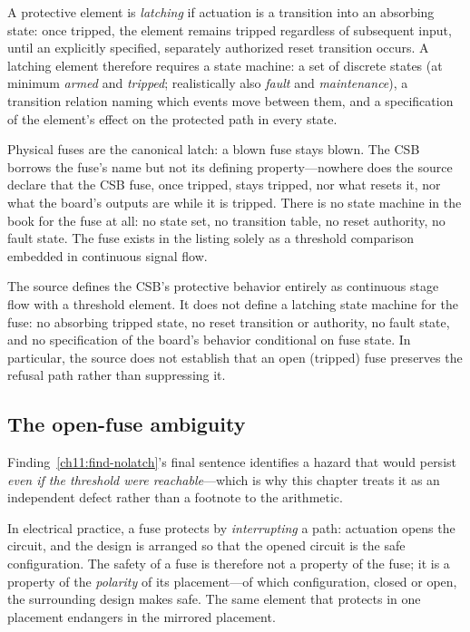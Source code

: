 \begin{definition}\label{ch11:def-latch}
A protective element is \emph{latching} if actuation is a transition into an absorbing state: once tripped, the element remains tripped regardless of subsequent input, until an explicitly specified, separately authorized reset transition occurs. A latching element therefore requires a state machine: a set of discrete states (at minimum \emph{armed} and \emph{tripped}; realistically also \emph{fault} and \emph{maintenance}), a transition relation naming which events move between them, and a specification of the element's effect on the protected path in every state.
\end{definition}

Physical fuses are the canonical latch: a blown fuse stays blown. The CSB borrows the fuse's name but not its defining property---nowhere does the source declare that the CSB fuse, once tripped, stays tripped, nor what resets it, nor what the board's outputs are while it is tripped. There is no state machine in the book for the fuse at all: no state set, no transition table, no reset authority, no fault state. The fuse exists in the listing solely as a threshold comparison embedded in continuous signal flow.

\begin{finding}\label{ch11:find-nolatch}
The source defines the CSB's protective behavior entirely as continuous stage flow with a threshold element. It does not define a latching state machine for the fuse: no absorbing tripped state, no reset transition or authority, no fault state, and no specification of the board's behavior conditional on fuse state. In particular, the source does not establish that an open (tripped) fuse preserves the refusal path rather than suppressing it.
\end{finding}

\subsection{The open-fuse ambiguity}\label{ch11:openfuse}

Finding~\ref{ch11:find-nolatch}'s final sentence identifies a hazard that would persist \emph{even if the threshold were reachable}---which is why this chapter treats it as an independent defect rather than a footnote to the arithmetic.

In electrical practice, a fuse protects by \emph{interrupting} a path: actuation opens the circuit, and the design is arranged so that the opened circuit is the safe configuration. The safety of a fuse is therefore not a property of the fuse; it is a property of the \emph{polarity} of its placement---of which configuration, closed or open, the surrounding design makes safe. The same element that protects in one placement endangers in the mirrored placement.

